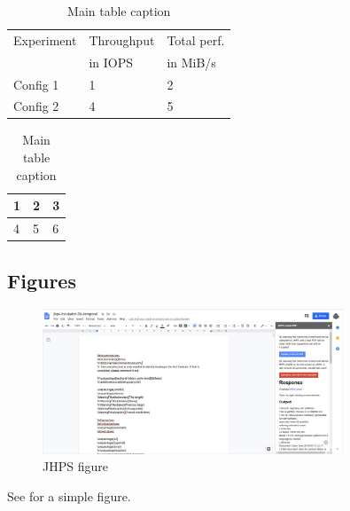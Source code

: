 \documentclass{jhps}
\begin{document}
\begin{table}
  \centering
  \begin{subtable}[t]{8cm}
  \centering
  \begin{tabular}{l|l|l}
         \rowcolor{tblhead} Experiment  & Throughput & Total perf.
  \\
         \rowcolor{tblhead}   & in IOPS & in MiB/s \\
       \hline
       \hline
   Config 1 & 1   &  2   \\
  \hline
   Config 2 & 4   &  5   \\
  \end{tabular}
  \caption{Caption 1}\label{tbl:1a}
  \end{subtable}
  \begin{subtable}[t]{3cm}
  \centering
  \begin{tabular}{|l|l|l|}
  \hline
   1   &  2   &  3  \\
  \hline
   4   &  5   &  6  \\
  \hline
  \end{tabular}
  \caption{Caption 2}\label{tbl:1b}
  \end{subtable}
  \caption{Main table caption}\label{tbl:1}
\end{table}

\subsection{Figures}

\begin{figure}   %
\includegraphics[width=0.8\textwidth]{jhps}
\caption{JHPS figure}
\label{fig:jhps}
\end{figure}

See  for a simple figure.
\end{document}
